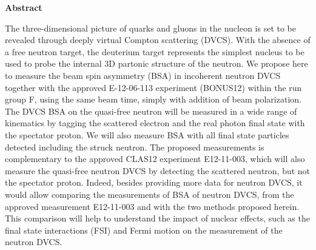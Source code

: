 \setcounter{page}{5}

     \begin{center}
{\large\textbf{Abstract}}
    \end{center}
\vspace*{0.4cm}

The three-dimensional picture of quarks and gluons in the nucleon is set to be 
revealed through deeply virtual Compton scattering (DVCS). With the absence of 
a free neutron target, the deuterium target represents the simplest nucleus to 
be used to probe the internal 3D partonic structure of the neutron.  We propose 
here to measure the beam spin asymmetry (BSA) in incoherent neutron DVCS 
together with the approved E-12-06-113 experiment (BONUS12) within the run 
group F, using the same beam time, simply with addition of beam polarization.  
The DVCS BSA on the quasi-free neutron will be measured in a wide range of 
kinematics by tagging the scattered electron and the real photon final state 
with the spectator proton. We will also measure BSA with all final state 
particles detected including the struck neutron. The proposed measurements is 
complementary to the approved CLAS12 experiment E12-11-003, which will also 
measure the quasi-free neutron DVCS by detecting the scattered neutron, but not 
the spectator proton.  Indeed, besides providing more data for neutron DVCS, it 
would allow comparing the measurements of BSA of neutron DVCS, from the 
approved measurement E12-11-003 and with the two methods proposed herein. This 
comparison will help to understand the impact of nuclear effects, such as the 
final state interactions (FSI) and Fermi motion on the measurement of the 
neutron DVCS.

\newpage

